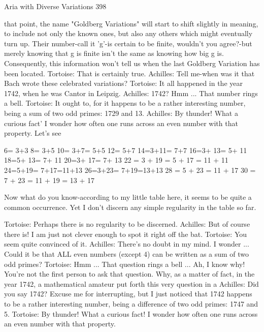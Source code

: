 Aria with Diverse Variations                                                              398

    that point, the name "Goldberg Variations" will start to shift slightly in meaning, to
    include not only the known ones, but also any others which might eventually turn up.
    Their number-call it 'g'-is certain to be finite, wouldn't you agree?-but merely
    knowing that g is finite isn't the same as knowing how big g is. Consequently, this
    information won't tell us when the last Goldberg Variation has been located.
Tortoise: That is certainly true.
Achilles: Tell me-when was it that Bach wrote these celebrated variations?
Tortoise: It all happened in the year 1742, when he was Cantor in Leipzig. Achilles:
    1742? Hmm ... That number rings a bell.
Tortoise: It ought to, for it happens to be a rather interesting number, being a sum of two
    odd primes: 1729 and 13.
Achilles: By thunder! What a curious fact' I wonder how often one runs across an even
    number with that property. Let's see

                       6= 3+3
                       8= 3+5
                       10= 3+7=      5+5
                       12= 5+7
                       14=3+11= 7+7
                       16=3+ 13= 5+ 11
                       18=5+ 13= 7+ 11
                       20=3+ 17= 7+ 13
                       22 = 3 + 19 = 5 + 17 =      11       + 11
                       24=5+19= 7+17=11+13
                       26=3+23= 7+19=13+13
                       28 = 5 + 23 = 11 + 17
                       30 = 7 + 23 = 11 + 19 = 13 + 17

    Now what do you know-according to my little table here, it seems to be quite a
    common occurrence. Yet I don't discern any simple regularity in the table so far.

Tortoise: Perhaps there is no regularity to be discerned.
Achilles: But of course there is! I am just not clever enough to spot it right off the bat.
Tortoise: You seem quite convinced of it.
Achilles: There's no doubt in my mind. I wonder ... Could it be that ALL even numbers
    (except 4) can be written as a sum of two odd primes?
Tortoise: Hmm ... That question rings a bell ... Ah, I know why! You're not the first
    person to ask that question. Why, as a matter of fact, in the year 1742, a
    mathematical amateur put forth this very question in a
Achilles: Did you say 1742? Excuse me for interrupting, but I just noticed that 1742
    happens to be a rather interesting number, being a difference of two odd primes:
    1747 and 5.
Tortoise: By thunder! What a curious fact! I wonder how often one runs across an even
    number with that property.




